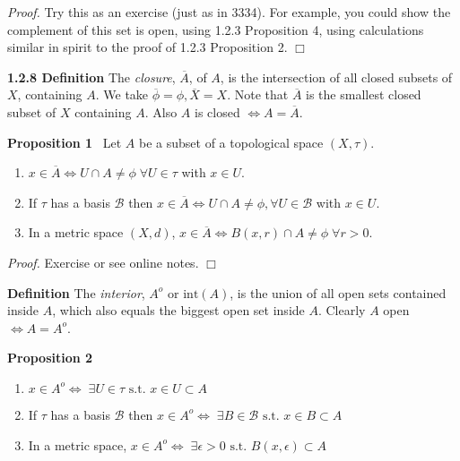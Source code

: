 \documentclass[12pt]{article}
\newcommand{\st}[0]{ \textrm{ s.t. } }
\newcommand{\lrimply}[0] { \Leftrightarrow }
\newcommand{\eps}[0] {  \epsilon }
\newcommand{\B}[0] { \mathcal{B} }
\begin{document}
\emph{Proof.  }  Try this as an exercise (just as in 3334).  For example,
you could show the complement of this set is open, using 1.2.3 Proposition 4,
using calculations similar in spirit to the proof of 1.2.3 Proposition 2.
$\Box$

\begin{flushleft} 
 { \bf 1.2.8 Definition }The \emph{closure}, $\overline{A}$, of $A$, is the intersection of all closed subsets of $X$, containing $A$.
   We take  $\overline{\phi} = \phi, \overline{X} = X$.
     Note that
 $\overline{A}$ is the smallest closed subset of $X$ containing $A$. 
Also $A$ is closed $\lrimply A = \overline{A}$.\end{flushleft}\begin{flushleft} 
 { \bf Proposition 1 } \ Let $A$ be a subset of a topological space $(X,\tau)$.
\begin{enumerate}
\item
                $x \in \overline{A} \lrimply U \cap A \neq \phi \; 
\forall  U \in \tau$ with $x \in U$.
            \item
                If $\tau$ has a basis $\B$ then $x \in \overline{A} 
\lrimply U \cap A \not = \phi, \forall U \in \B$ with $x \in U$.
            \item
                In a metric space $(X, d)$, $x \in \overline{A} \lrimply B(x, r) \cap A \not = \phi \; \forall r>0$.
            \end{enumerate}\begin{flushleft} 
 \emph{Proof.  }  Exercise or see online notes.   $\Box$ 
\end{flushleft}\end{flushleft}\begin{flushleft} 
 { \bf Definition }The \emph{interior}, $A^o$ or $\textrm{int}(A)$,
 is the union of all 
open sets contained inside $A$, which also equals the biggest open set inside $A$. Clearly $A$ open $\lrimply A = A^o$.\end{flushleft}\begin{flushleft} 
 { \bf Proposition 2 } \ \begin{enumerate}
\item
                $x \in A^o \lrimply \; \exists U \in \tau \st x \in U \subset A$
            \item
                If $\tau$ has a basis $\B$ then $x \in A^o \lrimply  \; \exists 
B \in \B \st x \in B \subset A$
            \item
                In a metric space, $x \in A^o \lrimply \; \exists \eps > 0 \st B(x, \eps) \subset A$

\end{enumerate}
\end{flushleft}
\end{document}
